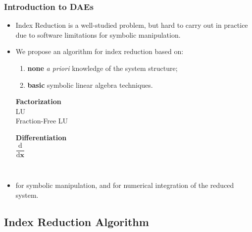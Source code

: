 \begin{frame}
  \frametitle{Introduction to \aclp{DAE}}
  \begin{itemize}
    \item Index Reduction is a well-studied problem, but hard to carry out in practice due to software limitations for symbolic manipulation.
    \\[1.0em]
    \item We propose an algorithm for index reduction based on:
    \\[0.5em]
    \begin{enumerate}
      \item \textbf{none} \emph{a priori} knowledge of the system structure;
      \\[0.5em]
      \item \textbf{basic} symbolic linear algebra techniques.
    \end{enumerate}
    \begin{center}\begin{minipage}[t]{0.30\textwidth}\begin{block}{}
      \centering
      \textbf{Factorization} \\[0.5em]
      LU \\ Fraction-Free LU \vspace*{0.15cm}
    \end{block}\end{minipage}
    \hspace*{2cm}
    \begin{minipage}[t]{0.30\textwidth}\begin{block}{}
      \centering
      \textbf{Differentiation} \\[0.75em]
      $\dfrac{\text{d}}{\text{d}\textbf{x}}$ \vspace*{0.15cm}
    \end{block}\end{minipage} \\[1.75em] \end{center}
    \item \Maple{} for symbolic manipulation, and \Matlab{} for numerical integration of the reduced system.
  \end{itemize}
\end{frame}

\subsection{Index Reduction Algorithm}

